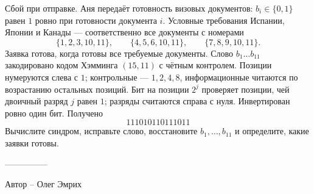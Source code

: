 \question
Сбой при отправке. Аня передаёт готовность визовых документов: $b_i\in\{0,1\}$ равен $1$ ровно при готовности документа $i$. Условные требования Испании, Японии и Канады --- соответственно все документы с номерами
\[
\{1,2,3,10,11\},\qquad \{4,5,6,10,11\},\qquad \{7,8,9,10,11\}.
\]
Заявка готова, когда готовы все требуемые документы. Слово $b_1\ldots b_{11}$ закодировано кодом Хэмминга $(15,11)$ с чётным контролем. Позиции нумеруются слева с $1$; контрольные --- $1,2,4,8$, информационные читаются по возрастанию остальных позиций. Бит на позиции $2^j$ проверяет позиции, чей двоичный разряд $j$ равен $1$; разряды считаются справа с нуля. Инвертирован ровно один бит. Получено
\[
111010110111011
\]
Вычислите синдром, исправьте слово, восстановите $b_1,\ldots,b_{11}$ и определите, какие заявки готовы.

---------------

Автор -- Олег Эмрих
